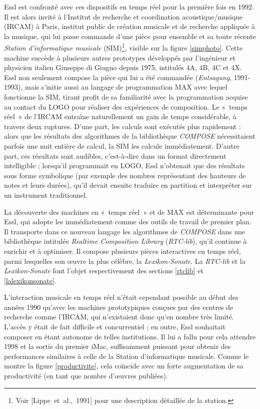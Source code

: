 \documentclass[a4paper,12pt]{article}
\newcommand{\guill}[1]{«~#1~»}
\newcommand{\cicite}[1]{{\footnotesize[#1]}}
\begin{document}
Essl est confronté avec ces dispositifs en temps réel pour la première fois en 1992. Il est alors invité à l'Institut de recherche et coordination acoustique/musique (IRCAM) à Paris, institut public de création musicale et de recherche appliquée à la musique, qui lui passe commande d'une pièce pour ensemble et sa toute récente \emph{Station d'informatique musicale} (SIM)\footnote{Voir \cicite{Lippe~et~al.,~1991} pour une description détaillée de la station.}, visible sur la figure \ref{simphoto}. Cette machine succède à plusieurs autres prototypes développés par l'ingénieur et physicien italien Giuseppe di Giugno depuis 1975, intitulés 4A, 4B, 4C et 4X. Essl non seulement compose la pièce qui lui a été commandée (\emph{Entsagung}, 1991-1993), mais s'initie aussi au langage de programmation MAX avec lequel fonctionne la SIM, tirant profit de sa familiarité avec la programmation acquise au contact du LOGO pour réaliser des expériences de composition. Le \guill{temps réel} de l'IRCAM entraîne naturellement un gain de temps considérable, à travers deux ruptures. D'une part, les calculs sont exécutés plus rapidement : alors que les résultats des algorithmes de la bibliothèque \emph{COMPOSE} nécessitaient parfois une nuit entière de calcul, la SIM les calcule immédiatement. D'autre part, ces résultats sont audibles, c'est-à-dire dans un format directement intelligible ; lorsqu'il programmait en LOGO, Essl n'obtenait que des résultats sous forme symbolique (par exemple des nombres représentant des hauteurs de notes et leurs durées), qu'il devait ensuite traduire en partition et interpréter sur un instrument traditionnel.

La découverte des machines en \guill{temps réel} et de MAX est déterminante pour Essl, qui adopte les immédiatement comme des outils de travail de premier plan. Il transporte dans ce nouveau langage les algorithmes de \emph{COMPOSE} dans une bibliothèque intitulée \emph{Realtime Composition Library} (\emph{RTC-lib}), qu'il continue à enrichir et à optimiser. Il compose plusieurs pièces interactives en temps réel, parmi lesquelles son œuvre la plus célèbre, la \emph{Lexikon-Sonate}. La \emph{RTC-lib} et la \emph{Lexikon-Sonate} font l'objet respectivement des sections \ref{rtclib} et \ref{lalexikonsonate}.

L'interaction musicale en temps réel n'était cependant possible au début des années 1990 qu'avec les machines prototypiques conçues par des centres de recherche comme l'IRCAM, qui n'existaient donc qu'en nombre très limité. L'accès y était de fait difficile et concurrentiel ; en outre, Essl souhaitait composer en étant autonome de telles institutions. Il lui a fallu pour cela attendre 1998 et la sortie du premier iMac, suffisamment puissant pour obtenir des performances similaires à celle de la Station d'informatique musicale. Comme le montre la figure \ref{productivite}, cela coïncide avec un forte augmentation de sa productivité (en tant que nombre d'œuvres publiées).
\end{document}
